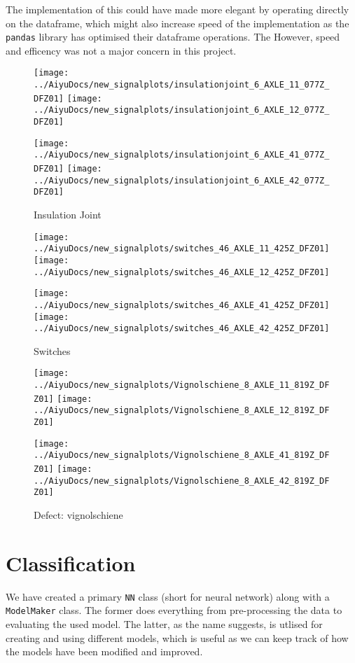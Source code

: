 The implementation of this could have made more elegant by operating directly on the dataframe, which might also increase speed of the implementation as the \verb|pandas| library has optimised their dataframe operations. The However, speed and efficency was not a major concern in this project. 

\begin{figure}[H]
	\centering
	\texttt{[image: ../AiyuDocs/new\_signalplots/insulationjoint\_6\_AXLE\_11\_077Z\_DFZ01]}
	\texttt{[image: ../AiyuDocs/new\_signalplots/insulationjoint\_6\_AXLE\_12\_077Z\_DFZ01]}
	
	\texttt{[image: ../AiyuDocs/new\_signalplots/insulationjoint\_6\_AXLE\_41\_077Z\_DFZ01]}
	\texttt{[image: ../AiyuDocs/new\_signalplots/insulationjoint\_6\_AXLE\_42\_077Z\_DFZ01]}
	\caption{Insulation Joint}
\end{figure}

\begin{figure}[H]
	\centering
	\texttt{[image: ../AiyuDocs/new\_signalplots/switches\_46\_AXLE\_11\_425Z\_DFZ01]}
	\texttt{[image: ../AiyuDocs/new\_signalplots/switches\_46\_AXLE\_12\_425Z\_DFZ01]}
	
	\texttt{[image: ../AiyuDocs/new\_signalplots/switches\_46\_AXLE\_41\_425Z\_DFZ01]}
	\texttt{[image: ../AiyuDocs/new\_signalplots/switches\_46\_AXLE\_42\_425Z\_DFZ01]}
	\caption{Switches}
\end{figure}

\begin{figure}[H]
	\centering
	\texttt{[image: ../AiyuDocs/new\_signalplots/Vignolschiene\_8\_AXLE\_11\_819Z\_DFZ01]}
	\texttt{[image: ../AiyuDocs/new\_signalplots/Vignolschiene\_8\_AXLE\_12\_819Z\_DFZ01]}
	
	\texttt{[image: ../AiyuDocs/new\_signalplots/Vignolschiene\_8\_AXLE\_41\_819Z\_DFZ01]}
	\texttt{[image: ../AiyuDocs/new\_signalplots/Vignolschiene\_8\_AXLE\_42\_819Z\_DFZ01]}
	\caption{Defect: vignolschiene}
\end{figure}



\section{Classification}
We have created a primary \verb|NN| class (short for neural network) along with a \verb|ModelMaker| class. The former does everything from pre-processing the data to evaluating the used model. The latter, as the name suggests, is utlised for creating and using different models, which is useful as we can keep track of how the models have been modified and improved. 

